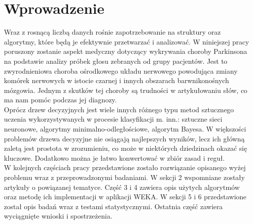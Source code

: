 \documentclass[conference]{IEEEtran}
\begin{document}
\section{Wprowadzenie}
Wraz z rosnącą liczbą danych rośnie zapotrzebowanie na struktury oraz algorytmy, które będą je efektywnie przetwarzać i analizować. W niniejszej pracy poruszony zostanie aspekt medyczny dotyczący wykrywania choroby Parkinsona na podstawie analizy próbek głosu zebranych od grupy pacjentów. Jest to zwyrodnieniowa choroba ośrodkowego układu nerwowego powodująca zmiany komórek nerwowych w istocie czarnej i innych obszarach barwnikonośnych mózgowia. Jednym z skutków tej choroby są trudności w artykułowaniu słów, co ma nam pomóc podczas jej diagnozy. \\
\indent Oprócz drzew decyzyjnych jest wiele innych różnego typu metod sztucznego uczenia wykorzystywanych w procesie klasyfikacji m. inn.: sztuczne sieci neuronowe, algorytmy minimalno-odległościowe, algorytm Bayesa. W większości problemów drzewa decyzyjne nie osiągają najlepszych wyników, lecz ich główną zaletą jest prostota w zrozumieniu, co może w niektórych dziedzinach okazać się kluczowe. Dodatkowo można je łatwo konwertować w zbiór zasad i reguł. \\
\indent W kolejnych częściach pracy przedstawione zostało rozwiązanie opisanego wyżej problemu wraz z przeprowadzonymi badaniami. W sekcji 2 wspomniane zostały artykuły o powiązanej tematyce. Część 3 i 4 zawiera opis użytych algorytmów oraz metodę ich implementacji w aplikacji WEKA. W sekcji 5 i 6 przedstawione został opis badań wraz z testami statystycznymi. Ostatnia część zawiera wyciągnięte wnioski i spostrzeżenia. 
\end{document}
